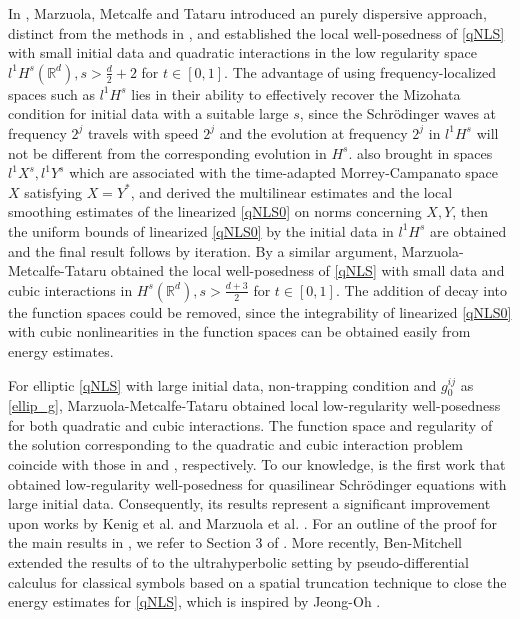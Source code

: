 \documentclass[10pt,twoside,a4paper]{article}
\numberwithin{equation}{section}\allowdisplaybreaks
\begin{document}
 In \cite{marzuola2012quasilinear}, Marzuola, Metcalfe and Tataru introduced an purely dispersive approach, distinct from the methods in \cite{kenig2004cauchy, kenig2005variable, kenig2006general},  and established  the  local well-posedness of  \eqref{qNLS} with  small initial data and  quadratic interactions in the low regularity space $ l^1H^s(\mathbb{R}^d),s>\frac d2 +2$  for $ t\in[0,1]$.   The advantage of using frequency-localized spaces such as $l^1H^s$ lies in their ability to effectively recover the Mizohata condition for initial data with a suitable large $s$, since the Schr\"odinger waves at frequency $ 2^j $ travels with speed $ 2^j $  and the evolution at frequency $ 2^j $  in $ l^1H^s $
 will not be different from the corresponding evolution in $ H^s $.   \cite{marzuola2012quasilinear} also brought in spaces $ l^1X^s,l^1Y^s $ which  are associated with the  time-adapted Morrey-Campanato space  $ X $  satisfying $ X=Y^* $, and derived the multilinear estimates  and the local smoothing estimates of the   linearized \eqref{qNLS0} on norms concerning $  X, Y$,  then the uniform bounds of  linearized \eqref{qNLS0} by the initial data in $ l^1H^s $  are obtained and   the final result follows by iteration. By a similar argument, Marzuola-Metcalfe-Tataru \cite{marzuola2014quasilinear}   obtained the  local well-posedness of  \eqref{qNLS} with small data and cubic  interactions in $ H^s(\mathbb{R}^d),s>\frac {d+3}2 $  for  $ t\in[0,1]$. The addition of decay into the function spaces could be removed, since the integrability of linearized \eqref{qNLS0} with cubic nonlinearities in the function spaces can be obtained easily  from energy estimates. 
 
 
 
 For elliptic \eqref{qNLS} with large  initial data, non-trapping
 condition and  $ g_0^{ij}   $ as \eqref{ellip_g}, Marzuola-Metcalfe-Tataru \cite{marzuola2021quasilinear} obtained local low-regularity well-posedness for both quadratic and cubic interactions. The function space  and regularity of the solution  corresponding to the quadratic and cubic interaction problem  coincide with those in \cite{marzuola2012quasilinear} and \cite{marzuola2021quasilinear}, respectively.  To our knowledge, \cite{marzuola2021quasilinear} is the first work that obtained low-regularity well-posedness for quasilinear Schrödinger equations with large initial data. Consequently, its results represent a significant improvement upon  works by Kenig et al. \cite{kenig2004cauchy,kenig2005variable,kenig2006general} and Marzuola et al. \cite{marzuola2012quasilinear,marzuola2014quasilinear}. 
 For an outline of the proof for the main results in \cite{marzuola2021quasilinear}, we refer to Section 3 of \cite{marzuola2021quasilinear}.  More recently,  Ben-Mitchell \cite{pineau2024low} extended the results of \cite{marzuola2021quasilinear}  to the ultrahyperbolic setting   by pseudo-differential calculus for classical symbols based on a spatial truncation technique to close the energy estimates for \eqref{qNLS}, which is inspired by Jeong-Oh \cite{jeong2024well-posedness}.
\end{document}
